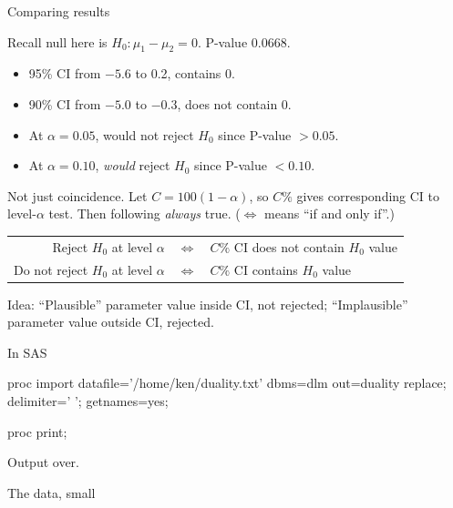\documentclass[unknownkeysallowed]{beamer}\usepackage[]{graphicx}\usepackage[]{color}
\begin{document}
\begin{frame}[fragile]{Comparing results}

Recall null here is $H_0: \mu_1-\mu_2=0$. P-value 0.0668.

  \begin{itemize}
  \item 95\% CI from $-5.6$ to 0.2, contains 0.
  \item 90\% CI from $-5.0$ to $-0.3$, does not contain 0.
  \item At $\alpha=0.05$, would not reject $H_0$ since P-value $>0.05$.
  \item At $\alpha=0.10$, \emph{would} reject $H_0$ since P-value $<0.10$.
  \end{itemize}

  Not just coincidence. Let $C=100(1-\alpha)$, so $C\%$ gives corresponding
  CI to level-$\alpha$ test. Then following \emph{always}
  true. ($\iff$ means ``if and only if''.)

\begin{tabular}{|rcl|}
  \hline
  Reject $H_0$ at level $\alpha$ & $\iff$ & $C\%$ CI does not contain $H_0$ value\\
  Do not reject $H_0$ at level $\alpha$ & $\iff$ & $C\%$ CI contains $H_0$ value\\
  \hline
\end{tabular}

Idea: ``Plausible'' parameter value inside CI, not rejected;
  ``Implausible'' parameter value outside CI, rejected.


\end{frame}

\begin{frame}[fragile]{In SAS}
  
    
  \begin{Datastep}
proc import
  datafile='/home/ken/duality.txt'
    dbms=dlm
    out=duality
    replace;
  delimiter=' ';
  getnames=yes;
  \end{Datastep}
  \begin{Sascode}[store=it]
proc print;
  \end{Sascode}
  Output over.

  
\end{frame}

\begin{frame}[fragile]{The data, small}
  
  
\end{frame}
\end{document}
